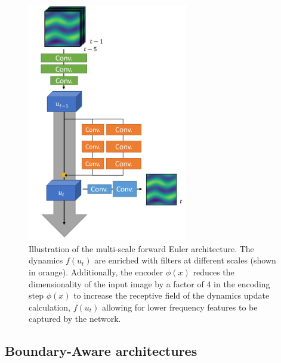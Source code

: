 \documentclass[12pt]{article}
\theoremstyle{plain}
\theoremstyle{remark}
\theoremstyle{definition}
\begin{document}
\begin{figure}
\begin{minipage}[c]{0.45\textwidth}
	\end{minipage}
	\hspace{0.1\textwidth}
	\begin{minipage}[c]{0.45\textwidth}
		\centering
		\includegraphics[width=2.75in]{pde_arch_multi}
		\caption{Illustration of the multi-scale forward Euler architecture. The
		dynamics $f(u_t)$ are enriched with filters at different scales (shown in orange). Additionally, the encoder $\phi(x)$ reduces the dimensionality of the input image by a factor of 4 in the encoding step $\phi(x)$ to increase the receptive field of the dynamics update calculation, $f(u_t)$ allowing for lower frequency features to be captured by the network. }
		\label{fig:arch_multi}
	\end{minipage}
\end{figure}



\subsection{Boundary-Aware architectures}
\end{document}
